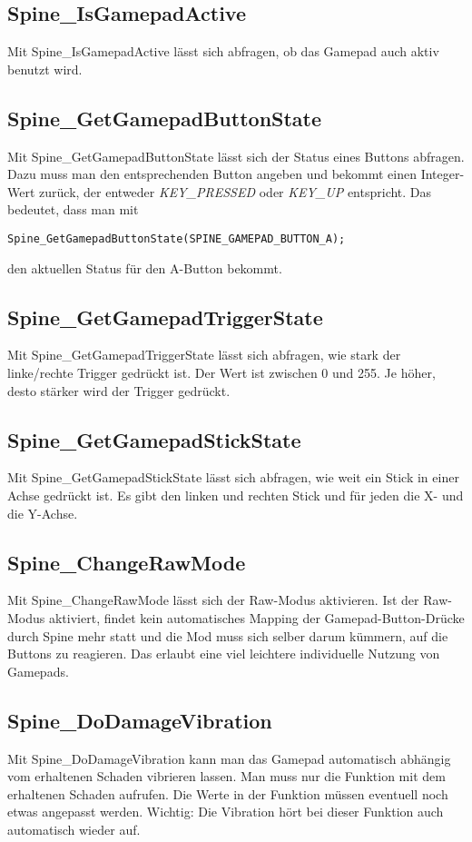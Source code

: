 \documentclass{article}
\begin{document}
\subsection{Spine\_IsGamepadActive}

Mit Spine\_IsGamepadActive lässt sich abfragen, ob das Gamepad auch aktiv benutzt wird.

\subsection{Spine\_GetGamepadButtonState}

Mit Spine\_GetGamepadButtonState lässt sich der Status eines Buttons abfragen. Dazu muss man den entsprechenden Button angeben und bekommt einen Integer-Wert zurück, der entweder \textit{KEY\_PRESSED} oder \textit{KEY\_UP} entspricht. Das bedeutet, dass man mit

\begin{lstlisting}
Spine_GetGamepadButtonState(SPINE_GAMEPAD_BUTTON_A);
\end{lstlisting}

den aktuellen Status für den A-Button bekommt.

\subsection{Spine\_GetGamepadTriggerState}

Mit Spine\_GetGamepadTriggerState lässt sich abfragen, wie stark der linke/rechte Trigger gedrückt ist. Der Wert ist zwischen 0 und 255. Je höher, desto stärker wird der Trigger gedrückt.

\subsection{Spine\_GetGamepadStickState}

Mit Spine\_GetGamepadStickState lässt sich abfragen, wie weit ein Stick in einer Achse gedrückt ist. Es gibt den linken und rechten Stick und für jeden die X- und die Y-Achse.

\subsection{Spine\_ChangeRawMode}

Mit Spine\_ChangeRawMode lässt sich der Raw-Modus aktivieren. Ist der Raw-Modus aktiviert, findet kein automatisches Mapping der Gamepad-Button-Drücke durch Spine mehr statt und die Mod muss sich selber darum kümmern, auf die Buttons zu reagieren. Das erlaubt eine viel leichtere individuelle Nutzung von Gamepads.

\subsection{Spine\_DoDamageVibration}

Mit Spine\_DoDamageVibration kann man das Gamepad automatisch abhängig vom erhaltenen Schaden vibrieren lassen. Man muss nur die Funktion mit dem erhaltenen Schaden aufrufen. Die Werte in der Funktion müssen eventuell noch etwas angepasst werden. Wichtig: Die Vibration hört bei dieser Funktion auch automatisch wieder auf.
\end{document}
